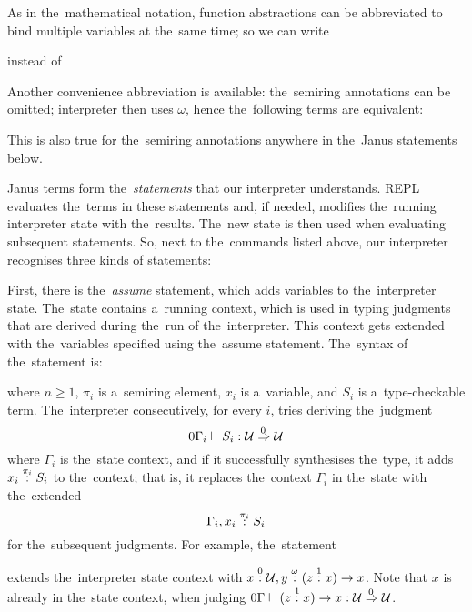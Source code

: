 As in the~mathematical notation, function abstractions can be abbreviated to
bind multiple variables at the~same time; so we can write
\begin{center}
   \hspace{3em} instead of \hspace{3em}
\end{center}

Another convenience abbreviation is available: the~semiring annotations can be
omitted; interpreter then uses $\omega$, hence the~following terms are
equivalent:
\begin{center}
   \hspace{6em}
\end{center}
This is also true for the~semiring annotations anywhere in the~Janus statements
below.

Janus terms form the~\emph{statements} that our interpreter understands. REPL
evaluates the~terms in these statements and, if needed, modifies the~running
interpreter state with the~results. The~new state is then used when evaluating
subsequent statements. So, next to the~commands listed above, our interpreter
recognises three kinds of statements:

First, there is the~\emph{assume} statement, which adds variables to
the~interpreter state. The~state contains a~running context, which is used in
typing judgments that are derived during the~run of the~interpreter. This
context gets extended with the~variables specified using the~assume statement.
The~syntax of the~statement is:
\begin{center}
\end{center}
where $n \geq 1$, $\pi_i$ is a~semiring element, $x_i$ is a~variable, and $S_i$
is a~type-checkable term. The~interpreter consecutively, for every $i$, tries
deriving the~judgment
\[
  0\Gamma_i \vdash S_i \overset{}: \mathcal{U} \overset{\!{0}}\Rightarrow \mathcal{U}
\]
where $\Gamma_i$ is the~state context, and if it successfully synthesises
the~type, it adds $x_i \overset{\pi_i}: S_i$ to the~context; that is, it replaces
the~context $\Gamma_i$ in the~state with the~extended
\[
  \Gamma_i, x_i \overset{\pi_i}: S_i
\]
for the~subsequent judgments. For example, the~statement
\begin{center}
\end{center}
extends the~interpreter state context with $x \overset{0}: \mathcal{U}, y \overset{\omega}:
(z \overset{1}: x) \to x$. Note that $x$ is already in the~state context, when judging
$0\Gamma \vdash (z \overset{1}: x) \to x \overset{}: \mathcal{U} \overset{\!{0}}\Rightarrow \mathcal{U}$.

